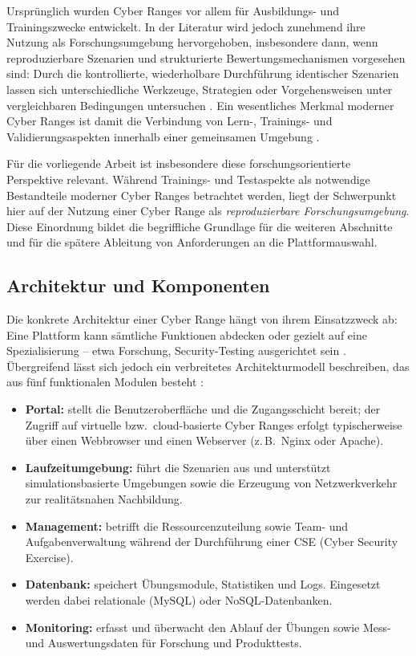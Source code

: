 Ursprünglich wurden Cyber Ranges vor allem für Ausbildungs- und Trainingszwecke entwickelt. In
der Literatur wird jedoch zunehmend ihre Nutzung als Forschungsumgebung hervorgehoben,
insbesondere dann, wenn reproduzierbare Szenarien und strukturierte Bewertungsmechanismen
vorgesehen sind: Durch die kontrollierte, wiederholbare Durchführung identischer Szenarien lassen
sich unterschiedliche Werkzeuge, Strategien oder Vorgehensweisen unter vergleichbaren Bedingungen
untersuchen \cite[2]{Chouliaras2021,Yamin2020CyberRanges}. Ein wesentliches Merkmal moderner
Cyber Ranges ist damit die Verbindung von Lern-, Trainings- und Validierungsaspekten innerhalb
einer gemeinsamen Umgebung \cite{IntroductionCyberRanges2022}.

Für die vorliegende Arbeit ist insbesondere diese forschungsorientierte Perspektive relevant.
Während Trainings- und Testaspekte als notwendige Bestandteile moderner Cyber Ranges betrachtet
werden, liegt der Schwerpunkt hier auf der Nutzung einer Cyber Range als \emph{reproduzierbare
Forschungsumgebung}. Diese Einordnung bildet die begriffliche Grundlage für die weiteren
Abschnitte und für die spätere Ableitung von Anforderungen an die Plattformauswahl.

\subsection{Architektur und Komponenten}
\label{subsec:cr-architektur}

Die konkrete Architektur einer Cyber Range hängt von ihrem Einsatzzweck ab: Eine Plattform
kann sämtliche Funktionen abdecken oder gezielt auf eine Spezialisierung -- etwa Forschung,
Security-Testing ausgerichtet sein \cite[13]{IntroductionCyberRanges2022}.
Übergreifend lässt sich jedoch ein verbreitetes Architekturmodell beschreiben, das aus fünf
funktionalen Modulen besteht \cite[13]{IntroductionCyberRanges2022}:

\begin{itemize}
  \item \textbf{Portal:} stellt die Benutzeroberfläche und die Zugangsschicht bereit; der
        Zugriff auf virtuelle bzw.\ cloud-basierte Cyber Ranges erfolgt typischerweise über
        einen Webbrowser und einen Webserver (z.\,B.\ Nginx oder Apache).
  \item \textbf{Laufzeitumgebung:} führt die Szenarien aus und unterstützt simulationsbasierte Umgebungen sowie die Erzeugung von Netzwerkverkehr zur realitätsnahen
        Nachbildung.
  \item \textbf{Management:} betrifft die Ressourcenzuteilung sowie Team- und Aufgabenverwaltung
        während der Durchführung einer CSE (Cyber Security Exercise).
  \item \textbf{Datenbank:} speichert Übungsmodule, Statistiken und Logs. Eingesetzt werden dabei 
        relationale (MySQL) oder NoSQL-Datenbanken.
  \item \textbf{Monitoring:} erfasst und überwacht den Ablauf der Übungen sowie Mess- und
        Auswertungsdaten für Forschung und Produkttests.
\end{itemize}

